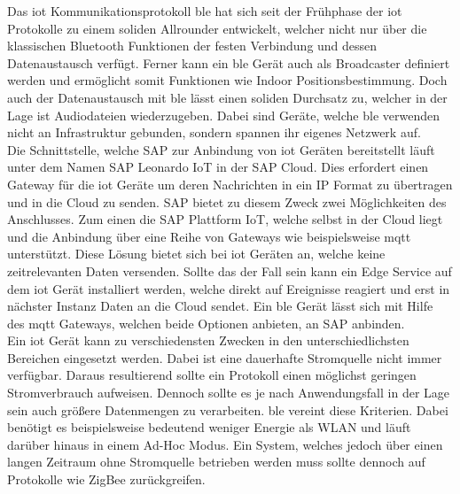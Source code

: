 \noindent Das \ac{iot} Kommunikationsprotokoll \ac{ble} hat sich seit der Frühphase der \ac{iot} Protokolle zu einem soliden Allrounder entwickelt, welcher nicht nur über die klassischen Bluetooth Funktionen der festen Verbindung und dessen Datenaustausch verfügt. Ferner kann ein \ac{ble} Gerät auch als Broadcaster definiert werden und ermöglicht somit Funktionen wie Indoor Positionsbestimmung. Doch auch der Datenaustausch mit \ac{ble} lässt einen soliden Durchsatz zu, welcher in der Lage ist Audiodateien wiederzugeben. Dabei sind Geräte, welche \ac{ble} verwenden nicht an Infrastruktur gebunden, sondern spannen ihr eigenes Netzwerk auf.\\ 
  
\noindent Die Schnittstelle, welche SAP zur Anbindung von \ac{iot} Geräten bereitstellt läuft unter dem Namen SAP Leonardo IoT in der SAP Cloud. Dies erfordert einen Gateway für die \ac{iot} Geräte um deren Nachrichten in ein IP Format zu übertragen und in die Cloud zu senden. SAP bietet zu diesem Zweck zwei Möglichkeiten des Anschlusses. Zum einen die SAP Plattform IoT, welche selbst in der Cloud liegt und die Anbindung über eine Reihe von Gateways wie beispielsweise \ac{mqtt} unterstützt. Diese Lösung bietet sich bei \ac{iot} Geräten an, welche keine zeitrelevanten Daten versenden. Sollte das der Fall sein kann ein Edge Service auf dem \ac{iot} Gerät installiert werden, welche direkt auf Ereignisse reagiert und erst in nächster Instanz Daten an die Cloud sendet. Ein \ac{ble} Gerät lässt sich mit Hilfe des \ac{mqtt} Gateways, welchen beide Optionen anbieten, an SAP anbinden.\\    
  
\noindent Ein \ac{iot} Gerät kann zu verschiedensten Zwecken in den unterschiedlichsten Bereichen eingesetzt werden. Dabei ist eine dauerhafte Stromquelle nicht immer verfügbar. Daraus resultierend sollte ein Protokoll einen möglichst geringen Stromverbrauch aufweisen. Dennoch sollte es je nach Anwendungsfall in der Lage sein auch größere Datenmengen zu verarbeiten. \ac{ble} vereint diese Kriterien. Dabei benötigt es beispielsweise bedeutend weniger Energie als WLAN und läuft darüber hinaus in einem Ad-Hoc Modus. Ein System, welches jedoch über einen langen Zeitraum ohne Stromquelle betrieben werden muss sollte dennoch auf Protokolle wie ZigBee zurückgreifen.\\      
  
